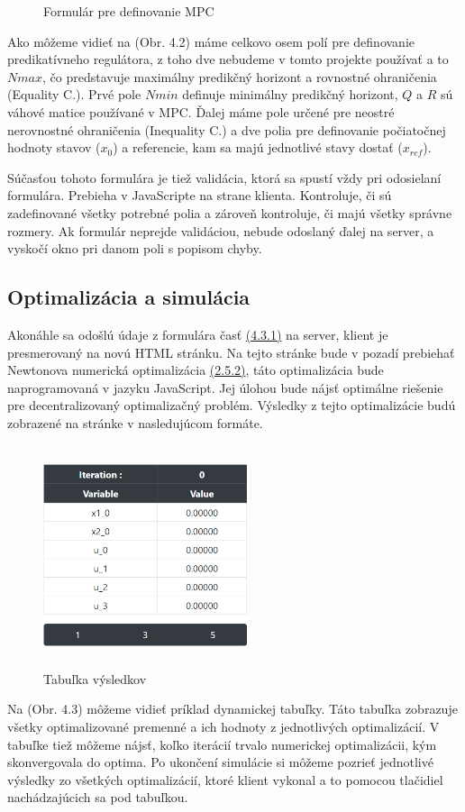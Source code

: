 \begin{enumerate}
{\begin{figure}[H]
	\caption{Formulár pre definovanie MPC}
\end{figure}
Ako môžeme vidieť na (Obr. 4.2) máme celkovo osem polí pre definovanie predikatívneho regulátora, z toho dve nebudeme v tomto projekte používať a to $Nmax$, čo predstavuje maximálny predikčný horizont a rovnostné ohraničenia (Equality C.). Prvé pole $Nmin$ definuje minimálny predikčný horizont, $Q$ a $R$ sú váhové matice používané v MPC. Ďalej máme pole určené pre neostré nerovnostné ohraničenia (Inequality C.) a dve polia pre definovanie počiatočnej hodnoty stavov ($x_{0}$) a referencie, kam sa majú jednotlivé stavy dostať ($x_{ref}$).
}
\end{enumerate}
Súčasťou tohoto formulára je tiež validácia, ktorá sa spustí vždy pri odosielaní formulára. Prebieha v JavaScripte na strane klienta. Kontroluje, či sú zadefinované všetky potrebné polia a zároveň kontroluje, či majú všetky správne rozmery. Ak formulár neprejde validáciou, nebude odoslaný ďalej na server, a vyskočí okno pri danom poli s popisom chyby.
\subsection{Optimalizácia a simulácia}
\label{subse:OPTaSIM}
Akonáhle sa odošlú údaje z formulára časť \hyperref[subse:Formular]{(4.3.1)} na server, klient je presmerovaný na novú HTML stránku. Na tejto stránke bude v pozadí prebiehať Newtonova numerická optimalizácia  \hyperref[opt:Newton]{(2.5.2)}, táto optimalizácia bude naprogramovaná v jazyku JavaScript. Jej úlohou bude nájsť optimálne riešenie pre decentralizovaný optimalizačný problém. Výsledky z tejto optimalizácie budú zobrazené na stránke v nasledujúcom formáte. 
\label{fig:Tabulka}
\begin{figure}[H]	
	\centering
	\includegraphics[width=6cm,height=6.5cm]{images/tabulka}
	\caption{Tabuľka výsledkov}
\end{figure}
Na (Obr. 4.3) môžeme vidieť príklad dynamickej tabuľky. Táto tabuľka zobrazuje všetky optimalizované premenné a ich hodnoty z jednotlivých optimalizácií. V tabuľke tiež môžeme nájsť, koľko iterácií trvalo numerickej optimalizácii, kým skonvergovala do optima. Po ukončení simulácie si môžeme pozrieť jednotlivé výsledky zo všetkých optimalizácií, ktoré klient vykonal a to pomocou tlačidiel nachádzajúcich sa pod tabuľkou.

